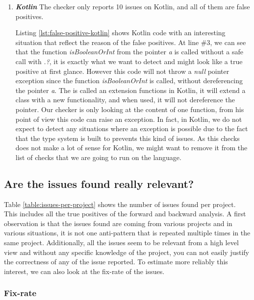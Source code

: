 \begin{enumerate}
	\item \textbf{\textit{Kotlin}}
	The checker only reports 10 issues on Kotlin, and all of them are false positives.
	
	
	
	Listing \ref{lst:false-positive-kotlin} shows Kotlin code with an interesting situation that reflect the reason of the false positives. 
	At line $\#3$, we can see that the function \emph{isBooleanOrInt} from the pointer \emph{a} is called without a safe call with \emph{.?}, it is exactly what we want to detect and might look like a true positive at first glance. 
	However this code will not throw a \emph{null} pointer exception since the function \emph{isBooleanOrInt} is called, without dereferencing the pointer \emph{a}.
	The is called an extension functions \cite{kotlinExtensionFun:2019:Online} in Kotlin, it will extend a class with a new functionality, and when used, it will not dereference the pointer.
	Our checker is only looking at the content of one function, from his point of view this code can raise an exception.
	In fact, in Kotlin, we do not expect to detect any situations where an exception is possible due to the fact that the type system is built to prevents this kind of issues.
	As this checks does not make a lot of sense for Kotlin, we might want to remove it from the list of checks that we are going to run on the language.
\end{enumerate}

\subsection{Are the issues found really relevant?}
\label{subsec:are_the_issues_relevant}

Table \ref{table:issues-per-project} shows the number of issues found per project. 
This includes all the true positives of the forward and backward analysis. 
A first observation is that the issues found are coming from various projects and in various situations, it is not one anti-pattern that is repeated multiple times in the same project. 
Additionally, all the issues seem to be relevant from a high level view and without any specific knowledge of the project, you can not easily justify the correctness of any of the issue reported.
To estimate more reliably this interest, we can also look at the fix-rate of the issues.

\subsubsection{Fix-rate}
\label{subsubsec:fix_rate}


